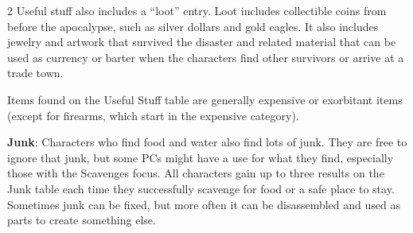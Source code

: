 \begin{multicols}{2}
Useful stuff also includes a “loot” entry. Loot includes collectible coins from before the apocalypse, such as silver dollars and gold eagles. It also includes jewelry and artwork that survived the disaster and related material that can be used as currency or barter when the characters find other survivors or arrive at a trade town.

Items found on the Useful Stuff table are generally expensive or exorbitant items (except for firearms, which start in the expensive category).

\textbf{Junk}: Characters who find food and water also find lots of junk. They are free to ignore that junk, but some PCs might have a use for what they find, especially those with the Scavenges focus. All characters gain up to three results on the Junk table each time they successfully scavenge for food or a safe place to stay. Sometimes junk can be fixed, but more often it can be disassembled and used as parts to create something else.

\end{multicols}

